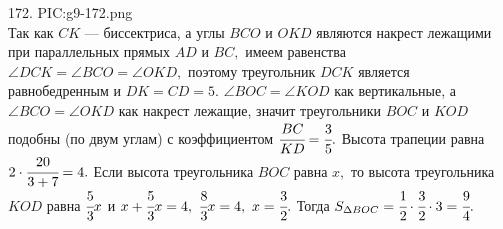 172. {{PIC:g9-172.png}}\\
Так как $CK$ --- биссектриса, а углы $BCO$ и $OKD$ являются накрест лежащими при параллельных прямых $AD$ и $BC,$ имеем равенства $\angle DCK=\angle BCO=\angle OKD,$ поэтому треугольник $DCK$ является равнобедренным и $DK=CD=5.$ $\angle BOC=\angle KOD$ как вертикальные, а $\angle BCO=\angle OKD$ как накрест лежащие, значит треугольники $BOC$ и $KOD$ подобны (по двум углам) с коэффициентом $\cfrac{BC}{KD}=\cfrac{3}{5}.$ Высота трапеции равна $2\cdot\cfrac{20}{3+7}=4.$ Если высота треугольника $BOC$ равна $x,$ то высота треугольника $KOD$ равна $\cfrac{5}{3}x$ и $x+\cfrac{5}{3}x=4,\ \cfrac{8}{3} x=4,\ x=\cfrac{3}{2}.$ Тогда $S_{\Delta BOC}=\cfrac{1}{2}\cdot\cfrac{3}{2}\cdot3=\cfrac{9}{4}.$\newpage\noindent
